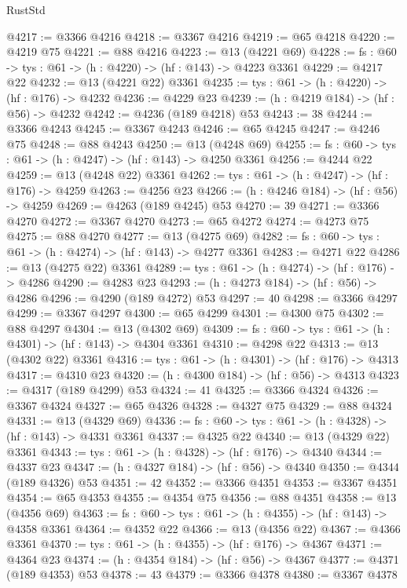 \begin{lexlean}{RustStd}
\begin{coremodule}
@4217 := @3366 @4216
@4218 := @3367 @4216
@4219 := @65 @4218
@4220 := @4219 @75
@4221 := @88 @4216
@4223 := @13 (@4221 @69)
@4228 := {fs : @60} -> {tys : @61} -> (h : @4220) -> (hf : @143) -> @4223 @3361
@4229 := @4217 @22
@4232 := @13 (@4221 @22) @3361
@4235 := {tys : @61} -> (h : @4220) -> (hf : @176) -> @4232
@4236 := @4229 @23
@4239 := (h : @4219 @184) -> (hf : @56) -> @4232
@4242 := @4236 (@189 @4218) @53
@4243 := 38
@4244 := @3366 @4243
@4245 := @3367 @4243
@4246 := @65 @4245
@4247 := @4246 @75
@4248 := @88 @4243
@4250 := @13 (@4248 @69)
@4255 := {fs : @60} -> {tys : @61} -> (h : @4247) -> (hf : @143) -> @4250 @3361
@4256 := @4244 @22
@4259 := @13 (@4248 @22) @3361
@4262 := {tys : @61} -> (h : @4247) -> (hf : @176) -> @4259
@4263 := @4256 @23
@4266 := (h : @4246 @184) -> (hf : @56) -> @4259
@4269 := @4263 (@189 @4245) @53
@4270 := 39
@4271 := @3366 @4270
@4272 := @3367 @4270
@4273 := @65 @4272
@4274 := @4273 @75
@4275 := @88 @4270
@4277 := @13 (@4275 @69)
@4282 := {fs : @60} -> {tys : @61} -> (h : @4274) -> (hf : @143) -> @4277 @3361
@4283 := @4271 @22
@4286 := @13 (@4275 @22) @3361
@4289 := {tys : @61} -> (h : @4274) -> (hf : @176) -> @4286
@4290 := @4283 @23
@4293 := (h : @4273 @184) -> (hf : @56) -> @4286
@4296 := @4290 (@189 @4272) @53
@4297 := 40
@4298 := @3366 @4297
@4299 := @3367 @4297
@4300 := @65 @4299
@4301 := @4300 @75
@4302 := @88 @4297
@4304 := @13 (@4302 @69)
@4309 := {fs : @60} -> {tys : @61} -> (h : @4301) -> (hf : @143) -> @4304 @3361
@4310 := @4298 @22
@4313 := @13 (@4302 @22) @3361
@4316 := {tys : @61} -> (h : @4301) -> (hf : @176) -> @4313
@4317 := @4310 @23
@4320 := (h : @4300 @184) -> (hf : @56) -> @4313
@4323 := @4317 (@189 @4299) @53
@4324 := 41
@4325 := @3366 @4324
@4326 := @3367 @4324
@4327 := @65 @4326
@4328 := @4327 @75
@4329 := @88 @4324
@4331 := @13 (@4329 @69)
@4336 := {fs : @60} -> {tys : @61} -> (h : @4328) -> (hf : @143) -> @4331 @3361
@4337 := @4325 @22
@4340 := @13 (@4329 @22) @3361
@4343 := {tys : @61} -> (h : @4328) -> (hf : @176) -> @4340
@4344 := @4337 @23
@4347 := (h : @4327 @184) -> (hf : @56) -> @4340
@4350 := @4344 (@189 @4326) @53
@4351 := 42
@4352 := @3366 @4351
@4353 := @3367 @4351
@4354 := @65 @4353
@4355 := @4354 @75
@4356 := @88 @4351
@4358 := @13 (@4356 @69)
@4363 := {fs : @60} -> {tys : @61} -> (h : @4355) -> (hf : @143) -> @4358 @3361
@4364 := @4352 @22
@4366 := @13 (@4356 @22)
@4367 := @4366 @3361
@4370 := {tys : @61} -> (h : @4355) -> (hf : @176) -> @4367
@4371 := @4364 @23
@4374 := (h : @4354 @184) -> (hf : @56) -> @4367
@4377 := @4371 (@189 @4353) @53
@4378 := 43
@4379 := @3366 @4378
@4380 := @3367 @4378

\end{coremodule}
\end{lexlean}
